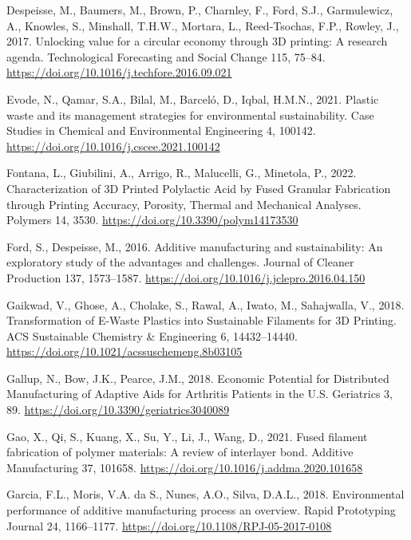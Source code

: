 \documentclass[
  12pt,
]{article}
\newlength{\cslhangindent}
\newlength{\cslentryspacingunit} %
\newenvironment{CSLReferences}[2] %
 {%
  \setlength{\parindent}{0pt}
  \ifodd #1
  \let\oldpar\par
  \def\par{\hangindent=\cslhangindent\oldpar}
  \fi
  \setlength{\parskip}{#2\cslentryspacingunit}
 }%
 {}
\begin{document}
\begin{CSLReferences}{1}{0}
\leavevmode{}%
Despeisse, M., Baumers, M., Brown, P., Charnley, F., Ford, S.J.,
Garmulewicz, A., Knowles, S., Minshall, T.H.W., Mortara, L.,
Reed-Tsochas, F.P., Rowley, J., 2017. Unlocking value for a circular
economy through {3D} printing: {A} research agenda. Technological
Forecasting and Social Change 115, 75--84.
\url{https://doi.org/10.1016/j.techfore.2016.09.021}

\leavevmode{}%
Evode, N., Qamar, S.A., Bilal, M., Barceló, D., Iqbal, H.M.N., 2021.
Plastic waste and its management strategies for environmental
sustainability. Case Studies in Chemical and Environmental Engineering
4, 100142. \url{https://doi.org/10.1016/j.cscee.2021.100142}

\leavevmode{}%
Fontana, L., Giubilini, A., Arrigo, R., Malucelli, G., Minetola, P.,
2022. Characterization of {3D Printed Polylactic Acid} by {Fused
Granular Fabrication} through {Printing Accuracy}, {Porosity}, {Thermal}
and {Mechanical Analyses}. Polymers 14, 3530.
\url{https://doi.org/10.3390/polym14173530}

\leavevmode{}%
Ford, S., Despeisse, M., 2016. Additive manufacturing and
sustainability: An exploratory study of the advantages and challenges.
Journal of Cleaner Production 137, 1573--1587.
\url{https://doi.org/10.1016/j.jclepro.2016.04.150}

\leavevmode{}%
Gaikwad, V., Ghose, A., Cholake, S., Rawal, A., Iwato, M., Sahajwalla,
V., 2018. Transformation of {E-Waste Plastics} into {Sustainable
Filaments} for {3D Printing}. ACS Sustainable Chemistry \& Engineering
6, 14432--14440. \url{https://doi.org/10.1021/acssuschemeng.8b03105}

\leavevmode{}%
Gallup, N., Bow, J.K., Pearce, J.M., 2018. Economic {Potential} for
{Distributed Manufacturing} of {Adaptive Aids} for {Arthritis Patients}
in the {U}.{S}. Geriatrics 3, 89.
\url{https://doi.org/10.3390/geriatrics3040089}

\leavevmode{}%
Gao, X., Qi, S., Kuang, X., Su, Y., Li, J., Wang, D., 2021. Fused
filament fabrication of polymer materials: {A} review of interlayer
bond. Additive Manufacturing 37, 101658.
\url{https://doi.org/10.1016/j.addma.2020.101658}

\leavevmode{}%
Garcia, F.L., Moris, V.A. da S., Nunes, A.O., Silva, D.A.L., 2018.
Environmental performance of additive manufacturing process
\textendash{} an overview. Rapid Prototyping Journal 24, 1166--1177.
\url{https://doi.org/10.1108/RPJ-05-2017-0108}


\end{CSLReferences}
\end{document}
